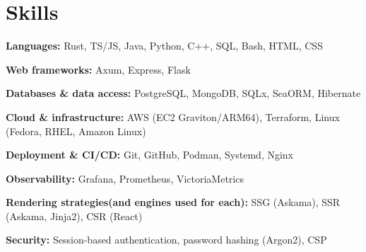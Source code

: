 \section{Skills}

\textbf{Languages:} Rust, TS/JS, Java, Python, C++, SQL, Bash, HTML, CSS

\textbf{Web frameworks:} Axum, Express, Flask

\textbf{Databases \& data access:} PostgreSQL, MongoDB, SQLx, SeaORM, Hibernate

\textbf{Cloud \& infrastructure:} AWS (EC2 Graviton/ARM64), Terraform, Linux (Fedora, RHEL, Amazon Linux)

\textbf{Deployment \& CI/CD:} Git, GitHub, Podman, Systemd, Nginx

\textbf{Observability:} Grafana, Prometheus, VictoriaMetrics

\textbf{Rendering strategies(and engines used for each):} SSG (Askama), SSR (Askama, Jinja2), CSR (React)

\textbf{Security:} Session-based authentication, password hashing (Argon2), CSP